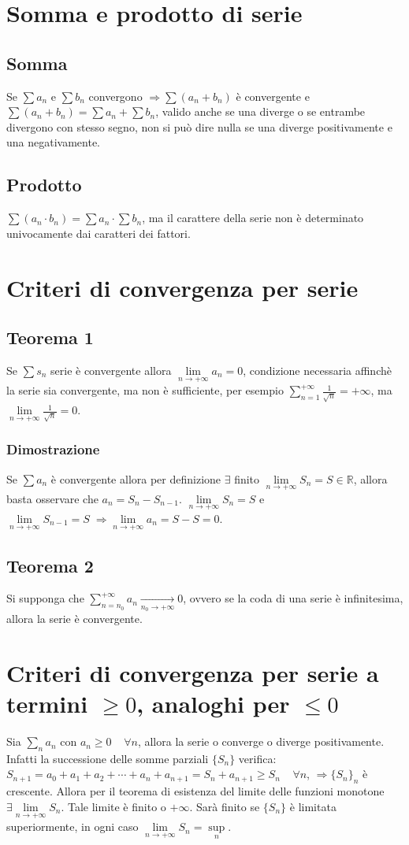 \section{Somma e prodotto di serie}
\subsection{Somma}
Se $\sum a_n$ e $\sum b_n$ convergono $\Rightarrow\sum (a_n+b_n)$ \`e convergente e $\sum (a_n+b_n)=\sum a_n+\sum b_n$, valido anche se una diverge o se entrambe divergono con 
stesso segno, non si pu\`o dire nulla se una diverge positivamente e una negativamente.
\subsection{Prodotto}
$\sum (a_n\cdot b_n)=\sum a_n\cdot\sum b_n$, ma il carattere della serie non \`e determinato univocamente dai caratteri dei fattori.
\section{Criteri di convergenza per serie}
\subsection{Teorema 1}
Se $\sum s_n$ serie \`e convergente allora $\lim\limits_{n\rightarrow+\infty}a_n=0$, condizione necessaria affinch\`e la serie sia convergente, ma non \`e sufficiente, per 
esempio $\sum\limits_{n=1}^{+\infty}\frac{1}{\sqrt{n}}=+\infty$, ma $\lim\limits_{n\rightarrow+\infty}\frac{1}{\sqrt{n}}=0$.
\subsubsection{Dimostrazione}
Se $\sum a_n$ \`e convergente allora per definizione $\exists$ finito $\lim\limits_{n\rightarrow+\infty}S_n=S\in\mathbb{R}$, allora basta osservare che $a_n=S_n-S_{n-1}$.
$\lim\limits_{n\rightarrow+\infty}S_n=S$ e $\lim\limits_{n\rightarrow+\infty}S_{n-1}=S\;\Rightarrow\lim\limits_{n\rightarrow+\infty}a_n=S-S=0$.
\subsection{Teorema 2}
Si supponga che $\sum\limits_{n=n_0}^{+\infty} a_n\xrightarrow[n_0\rightarrow +\infty]{}0$, ovvero se la coda di una serie \`e infinitesima, allora la serie \`e 
convergente.
\section{Criteri di convergenza per serie a termini $\ge 0$, analoghi per $\le 0$}
Sia $\sum\limits_n a_n$ con $a_n\ge 0\;\;\;\;\forall n$, allora la serie o converge o diverge positivamente. Infatti la successione delle somme parziali $\{S_n\}$ verifica: 
$S_{n+1}=a_0+a_1+a_2+\cdots+a_n+a_{n+1}=S_n+a_{n+1}\ge S_n\;\;\;\;\forall n$, $\Rightarrow\{S_n\}_n$ \`e crescente. Allora per il teorema di esistenza del limite delle funzioni 
monotone $\exists\lim\limits_{n\rightarrow+\infty}S_n$. Tale limite \`e finito o $+\infty$. Sar\`a finito se $\{S_n\}$ \`e limitata superiormente, in ogni caso $\lim\limits_{n
\rightarrow+\infty}S_n=\sup\limits_{n}$.
